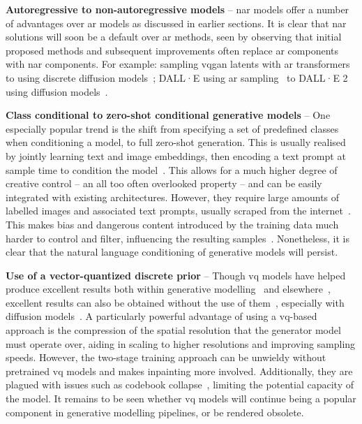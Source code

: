 \textbf{Autoregressive to non-autoregressive models} -- 
\Gls{nar} models offer a number of advantages over \gls{ar} models as discussed
in earlier sections. It is clear that \gls{nar} solutions will soon be a default
over \gls{ar} methods, seen by observing that initial proposed methods and
subsequent improvements often replace \gls{ar} components with \gls{nar}
components. For example: sampling \gls{vqgan} latents with \gls{ar}
transformers~\cite{esser2021taming} to using discrete diffusion
models~\cite{bondtaylor2021unleashing}; DALL·E using \gls{ar}
sampling~\cite{ramesh2021dalle} to DALL·E 2 using diffusion
models~\cite{ramesh2022dalle2}.

\textbf{Class conditional to zero-shot conditional generative models} -- One
especially popular trend is the shift from specifying a set of predefined
classes when conditioning a model, to full zero-shot generation. This is usually
realised by jointly learning text and image embeddings, then encoding a text
prompt at sample time to condition the
model~\cite{ramesh2021dalle,ramesh2022dalle2,rombach2021highresolution,lee2022rqvae}.
This allows for a much higher degree of creative control -- an all too often
overlooked property -- and can be easily integrated with existing architectures.
However, they require large amounts of labelled images and associated text
prompts, usually scraped from the
internet~\cite{rombach2021highresolution,ramesh2021dalle,ramesh2022dalle2}. This
makes bias and dangerous content introduced by the training data much harder to
control and filter, influencing the resulting samples~\cite{mishkin2022risks}.
Nonetheless, it is clear that the natural language conditioning of generative
models will persist.

\textbf{Use of a vector-quantized discrete prior} -- 
Though \gls{vq} models have helped produce excellent results both within
generative
modelling~\cite{razavi2019generating,esser2021taming,bondtaylor2021unleashing,rombach2021highresolution,ramesh2021dalle,yu2021vqgan,lee2022rqvae}
and elsewhere~\cite{zeghidour2021soundstream}, excellent results can also be
obtained without the use of
them~\cite{child2020vqvae,arash2020nvae,hazami2022efficient}, especially with
diffusion
models~\cite{song2019sbm,song2020sde,dhariwal2021ddpm,song2021mlt,xiao2021trilemma,vahdat2021sbmlatent,martineau2021fast,dockhorn2021langevin}.
A particularly powerful advantage of using a \gls{vq}-based approach is the
compression of the spatial resolution that the generator model must operate
over, aiding in scaling to higher resolutions and improving sampling speeds.
However, the two-stage training approach can be unwieldy without pretrained
\gls{vq} models and makes inpainting more involved. Additionally,
they are plagued with issues such as codebook
collapse~\cite{esser2021taming,bondtaylor2021unleashing,yu2021vqgan}, limiting
the potential capacity of the model. It remains to be seen whether \gls{vq}
models will continue being a popular component in generative modelling pipelines,
or be rendered obsolete.

